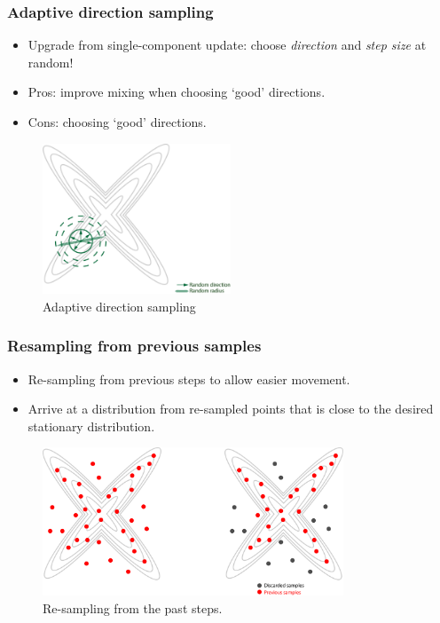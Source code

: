 \documentclass[10pt]{beamer}
\begin{document}
\begin{frame}
	\frametitle{Adaptive direction sampling}
	\begin{itemize}
		\item Upgrade from single-component update: choose \textit{direction} and \textit{step size} at random!
		\item Pros: improve mixing when choosing `good' directions.
		\item Cons: choosing `good' directions.
	\end{itemize}
	\begin{figure}[h]
		\centering
		\includegraphics[width=0.5\textwidth]{adaptive-direction}
		\caption{Adaptive direction sampling}
	\end{figure}	
\end{frame}

\begin{frame}
	\frametitle{Resampling from previous samples}
	\begin{itemize}
		\item Re-sampling from previous steps to allow easier movement.
		\item Arrive at a distribution from re-sampled points that is close to the desired stationary distribution.
	\end{itemize}
	\begin{figure}[h]
		\centering
		\includegraphics[width=0.8\textwidth]{resampling}
		\caption{Re-sampling from the past steps.}
	\end{figure}	
\end{frame}
\end{document}
